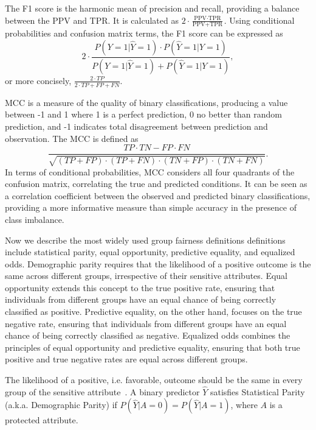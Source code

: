 \begin{definition}[F1 Score]\label{def:f1}
The F1 score is the harmonic mean of precision and recall, providing a balance between the PPV and TPR. It is calculated as $2 \cdot \frac{\text{PPV} \cdot \text{TPR}}{\text{PPV} + \text{TPR}}$. Using conditional probabilities and confusion matrix terms, the F1 score can be expressed as $$2 \cdot \frac{P(Y=1|\hat{Y}=1) \cdot P(\hat{Y}=1|Y=1)}{P(Y=1|\hat{Y}=1) + P(\hat{Y}=1|Y=1)},$$ or more concisely, $\frac{2 \cdot TP}{2 \cdot TP + FP + FN}$.
\end{definition}

\begin{definition}\label{def:mcc}
MCC is a measure of the quality of binary classifications, producing a value between -1 and 1 where 1 is a perfect prediction, 0 no better than random prediction, and -1 indicates total disagreement between prediction and observation. The MCC is defined as $$\frac{TP \cdot TN - FP \cdot FN}{\sqrt{(TP+FP) \cdot (TP+FN) \cdot (TN+FP) \cdot (TN+FN)}}.$$ In terms of conditional probabilities, MCC considers all four quadrants of the confusion matrix, correlating the true and predicted conditions. It can be seen as a correlation coefficient between the observed and predicted binary classifications, providing a more informative measure than simple accuracy in the presence of class imbalance.
\end{definition}
    
Now we describe the most widely used group fairness definitions definitions include statistical parity, equal opportunity, predictive equality, and equalized odds. Demographic parity requires that the likelihood of a positive outcome is the same across different groups, irrespective of their sensitive attributes. Equal opportunity extends this concept to the true positive rate, ensuring that individuals from different groups have an equal chance of being correctly classified as positive. Predictive equality, on the other hand, focuses on the true negative rate, ensuring that individuals from different groups have an equal chance of being correctly classified as negative. Equalized odds combines the principles of equal opportunity and predictive equality, ensuring that both true positive and true negative rates are equal across different groups.

\begin{definition}\label{def:demo_parity}
The likelihood of a positive, i.e. favorable, outcome should be the same in every group of the sensitive attribute~\citep{Dwork2011,Kusner2018}. A binary predictor $\hat{Y}$ satisfies Statistical Parity (a.k.a. Demographic Parity) if $P(\hat{Y}|A=0) = P(\hat{Y}|A=1)$, where $A$ is a protected attribute.
\end{definition}

